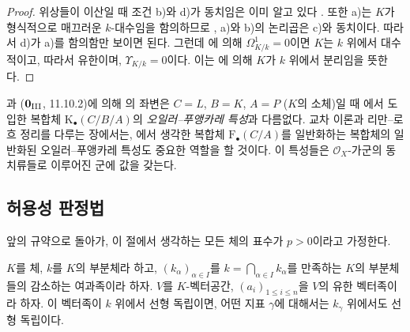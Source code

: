 \begin{proof}
위상들이 이산일 때 조건 b)와 d)가 동치임은 이미 알고 있다
. 또한 a)는 $K$가 형식적으로 매끄러운 $k$-대수임을
함의하므로 , a)와 b)의 논리곱은 c)와 동치이다.
따라서 d)가 a)를 함의함만 보이면 된다. 그런데
에 의해 $\Omega^1_{K/k}=0$이면 $K$는 $k$ 위에서
대수적이고, 따라서 유한이며, $\Upsilon_{K/k}=0$이다. 이는
에 의해 $K$가 $k$ 위에서 분리임을 뜻한다.
\end{proof}

\begin{remark}[21.7.5]
\label{0.21.7.5-ko}
과 ($\mathbf 0_{\rm III}$, 11.10.2)에 의해
의 좌변은 $C=L$, $B=K$, $A=P$ ($K$의 소체)일 때
에서 도입한 복합체 $\mathrm K_\bullet(C/B/A)$의
\emph{오일러--푸앵카레 특성}과 다름없다. 교차 이론과
리만--로흐 정리를 다루는 장에서는, 에서 생각한
복합체 $\mathrm F_\bullet(C/A)$를 일반화하는 복합체의 일반화된
오일러--푸앵카레 특성도 중요한 역할을 할 것이다. 이 특성들은
$\mathcal O_X$-가군의 동치류들로 이루어진 군에 값을 갖는다.
\end{remark}

\subsection{허용성 판정법}
\label{subsection:0.21.8-ko}

앞의 규약으로 돌아가, 이 절에서 생각하는 모든 체의 표수가 $p>0$이라고
가정한다.

\begin{lemma}[21.8.1]
\label{0.21.8.1-ko}
$K$를 체, $k$를 $K$의 부분체라 하고, $(k_\alpha)_{\alpha\in I}$를
$k=\bigcap_{\alpha\in I}k_\alpha$를 만족하는 $K$의 부분체들의 감소하는
여과족이라 하자. $V$를 $K$-벡터공간,
$(a_i)_{1\leqslant i\leqslant n}$을 $V$의 유한 벡터족이라 하자.
이 벡터족이 $k$ 위에서 선형 독립이면, 어떤 지표 $\gamma$에 대해서는
$k_\gamma$ 위에서도 선형 독립이다.
\end{lemma}

